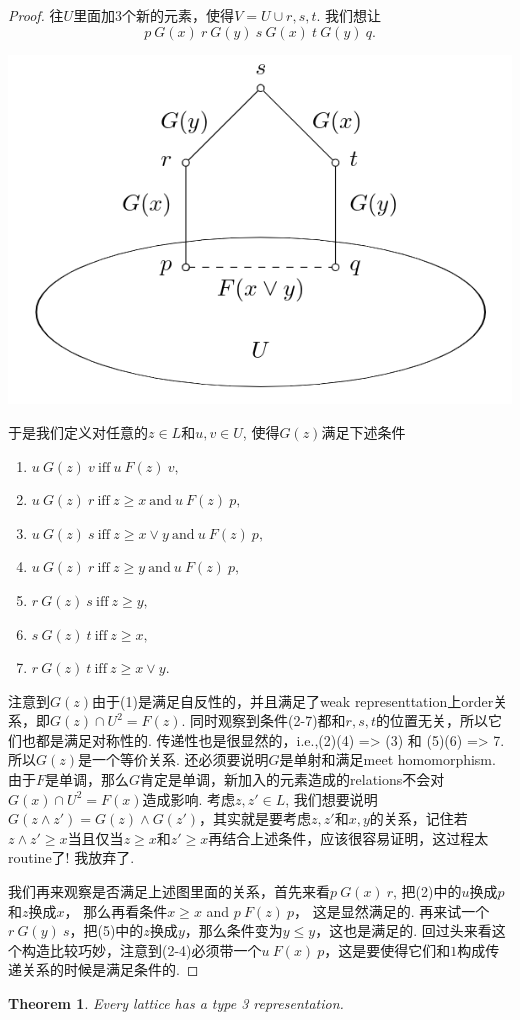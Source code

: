 \documentclass{article}
\newtheorem{theorem}{Theorem}[section]
\begin{document}
\begin{proof}
往$U$里面加3个新的元素，使得$V = U \cup {r,s,t}$. 我们想让
$$
p~G(x)~r~G(y)~s~G(x)~t~G(y)~q.
$$
\begin{center}
\includegraphics[scale=0.5]{./images/rel_lattice.png}
\end{center}
于是我们定义对任意的$z \in L$和$u,v \in U$, 使得$G(z)$满足下述条件
\begin{enumerate}
	\item $u~G(z)~v~\text{iff}~u~F(z)~v,$
	\item $u~G(z)~r~\text{iff}~z \geq x ~\text{and}~u~F(z)~p,$
	\item $u~G(z)~s~\text{iff}~z \geq x \vee y ~\text{and}~u~F(z)~p,$
	\item $u~G(z)~r~\text{iff}~z \geq y ~\text{and}~u~F(z)~p,$
	\item $r~G(z)~s~\text{iff}~z \geq y,$
	\item $s~G(z)~t~\text{iff}~z \geq x,$
	\item $r~G(z)~t~\text{iff}~z \geq x \vee y.$
\end{enumerate}
注意到$G(z)$由于(1)是满足自反性的，并且满足了weak representtation上order关系，即$G(z) \cap U^2 = F(z)$. 同时观察到条件(2-7)都和$r,s,t$的位置无关，所以它们也都是满足对称性的. 传递性也是很显然的，i.e.,(2)(4) => (3) 和 (5)(6) => 7. 所以$G(z)$是一个等价关系. 还必须要说明$G$是单射和满足meet homomorphism. 由于$F$是单调，那么$G$肯定是单调，新加入的元素造成的relations不会对$G(x) \cap U^2 = F(x)$造成影响. 考虑$z,z' \in L$, 我们想要说明$G(z \wedge z') = G(z) \wedge G(z')$，其实就是要考虑$z,z'$和$x,y$的关系，记住若$z \wedge z' \geq x$当且仅当$z \geq x$和$z' \geq x$再结合上述条件，应该很容易证明，这过程太routine了! 我放弃了.

我们再来观察是否满足上述图里面的关系，首先来看$p~G(x)~r$, 把(2)中的$u$换成$p$和$z$换成$x$， 那么再看条件$x \geq x$ and $p~F(z)~p$， 这是显然满足的. 再来试一个$r~G(y)~s$，把(5)中的$z$换成$y$，那么条件变为$y \leq y$，这也是满足的. 回过头来看这个构造比较巧妙，注意到(2-4)必须带一个$u~F(x)~p$，这是要使得它们和$1$构成传递关系的时候是满足条件的.
\end{proof}

\begin{theorem}
\rm Every lattice has a type 3 representation.
\end{theorem}
\end{document}
